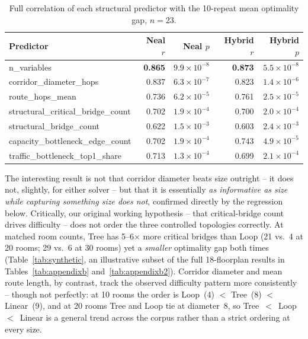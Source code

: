 \documentclass[11pt]{article}
\begin{document}
\begin{table}[h]
\centering
\caption{Full correlation of each structural predictor with the 10-repeat mean optimality gap, $n=23$.}
\label{tab:correlations}
\small
\begin{tabular}{lrrrr}
\toprule
Predictor & Neal $r$ & Neal $p$ & Hybrid $r$ & Hybrid $p$ \\
\midrule
n\_variables & \textbf{0.865} & $9.9\times10^{-8}$ & \textbf{0.873} & $5.5\times10^{-8}$ \\
corridor\_diameter\_hops & 0.837 & $6.3\times10^{-7}$ & 0.823 & $1.4\times10^{-6}$ \\
route\_hops\_mean & 0.736 & $6.2\times10^{-5}$ & 0.761 & $2.5\times10^{-5}$ \\
structural\_critical\_bridge\_count & 0.702 & $1.9\times10^{-4}$ & 0.700 & $2.0\times10^{-4}$ \\
structural\_bridge\_count & 0.622 & $1.5\times10^{-3}$ & 0.603 & $2.4\times10^{-3}$ \\
capacity\_bottleneck\_edge\_count & 0.702 & $1.9\times10^{-4}$ & 0.743 & $4.9\times10^{-5}$ \\
traffic\_bottleneck\_top1\_share & 0.713 & $1.3\times10^{-4}$ & 0.699 & $2.1\times10^{-4}$ \\
\bottomrule
\end{tabular}
\end{table}

The interesting result is not that corridor diameter beats size outright -- it does not, slightly, for either solver -- but that it is essentially \emph{as informative as size while capturing something size does not}, confirmed directly by the regression below. Critically, our original working hypothesis -- that critical-bridge count drives difficulty -- does not order the three controlled topologies correctly. At matched room counts, Tree has 5--6$\times$ more critical bridges than Loop (21 vs.\ 4 at 20 rooms; 29 vs.\ 6 at 30 rooms) yet a \emph{smaller} optimality gap both times (Table~\ref{tab:synthetic}, an illustrative subset of the full 18-floorplan results in Tables~\ref{tab:appendixb} and~\ref{tab:appendixb2}). Corridor diameter and mean route length, by contrast, track the observed difficulty pattern more consistently -- though not perfectly: at 10 rooms the order is Loop~(4) $<$ Tree~(8) $<$ Linear~(9), and at 20 rooms Tree and Loop tie at diameter~8, so Tree~$<$~Loop~$<$~Linear is a general trend across the corpus rather than a strict ordering at every size.
\end{document}
